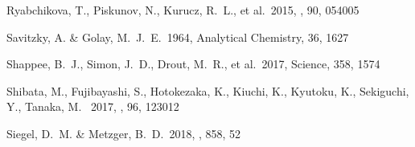\documentclass[twocolumn,twocolappendix]{aastex63}
\begin{document}
{\begin{thebibliography}{}




 Ryabchikova, T., Piskunov, N., Kurucz, R.~L., et al.\ 2015, \physscr, 90, 054005




 Savitzky, A. \& Golay, M.~J.~E.\ 1964, Analytical Chemistry, 36, 1627








 Shappee, B.~J., Simon, J.~D., Drout, M.~R., et al.\ 2017, Science, 358, 1574






 Shibata, M., Fujibayashi, S., Hotokezaka, K., Kiuchi, K., Kyutoku, K., Sekiguchi, Y., Tanaka, M. \ 2017, \prd, 96, 123012








 Siegel, D.~M. \& Metzger, B.~D.\ 2018, \apj, 858, 52



\end{thebibliography}}
\end{document}
